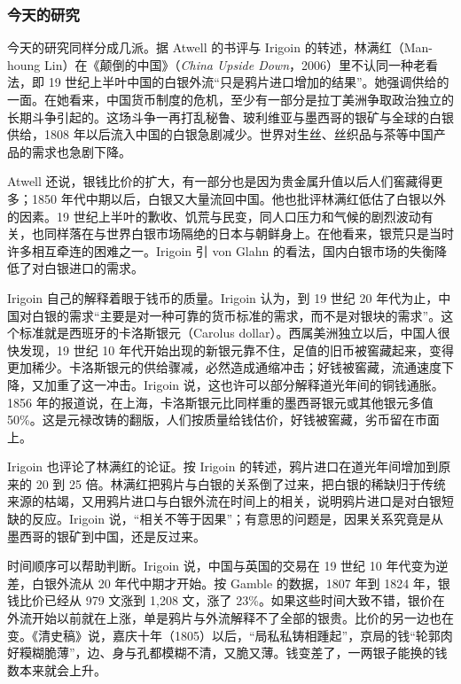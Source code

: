 \subsubsection{今天的研究}
今天的研究同样分成几派。据 Atwell 的书评与 Irigoin 的转述，林满红（Man-houng Lin）在《颠倒的中国》（\emph{China Upside Down}，2006）里不认同一种老看法，即 19 世纪上半叶中国的白银外流“只是鸦片进口增加的结果”\cite{atwell2008}。她强调供给的一面。在她看来，中国货币制度的危机，至少有一部分是拉丁美洲争取政治独立的长期斗争引起的。这场斗争一再打乱秘鲁、玻利维亚与墨西哥的银矿与全球的白银供给，1808 年以后流入中国的白银急剧减少。世界对生丝、丝织品与茶等中国产品的需求也急剧下降\cite{atwell2008,irigoin2013}。

Atwell 还说，银钱比价的扩大，有一部分也是因为贵金属升值以后人们窖藏得更多；1850 年代中期以后，白银又大量流回中国\cite{atwell2008}。他也批评林满红低估了白银以外的因素。19 世纪上半叶的歉收、饥荒与民变，同人口压力和气候的剧烈波动有关，也同样落在与世界白银市场隔绝的日本与朝鲜身上。在他看来，银荒只是当时许多相互牵连的困难之一\cite{atwell2008}。Irigoin 引 von Glahn 的看法，国内白银市场的失衡降低了对白银进口的需求\cite{irigoin2013}。

Irigoin 自己的解释着眼于钱币的质量。Irigoin 认为，到 19 世纪 20 年代为止，中国对白银的需求“主要是对一种可靠的货币标准的需求，而不是对银块的需求”。这个标准就是西班牙的卡洛斯银元（Carolus dollar）\cite{irigoin2013}。西属美洲独立以后，中国人很快发现，19 世纪 10 年代开始出现的新银元靠不住，足值的旧币被窖藏起来，变得更加稀少。卡洛斯银元的供给骤减，必然造成通缩冲击；好钱被窖藏，流通速度下降，又加重了这一冲击。Irigoin 说，这也许可以部分解释道光年间的铜钱通胀\cite{irigoin2013}。1856 年的报道说，在上海，卡洛斯银元比同样重的墨西哥银元或其他银元多值 50\%\cite{irigoin2013}。这是元禄改铸的翻版，人们按质量给钱估价，好钱被窖藏，劣币留在市面上。

Irigoin 也评论了林满红的论证。按 Irigoin 的转述，鸦片进口在道光年间增加到原来的 20 到 25 倍。林满红把鸦片与白银的关系倒了过来，把白银的稀缺归于传统来源的枯竭，又用鸦片进口与白银外流在时间上的相关，说明鸦片进口是对白银短缺的反应。Irigoin 说，“相关不等于因果”；有意思的问题是，因果关系究竟是从墨西哥的银矿到中国，还是反过来\cite{irigoin2013}。

时间顺序可以帮助判断。Irigoin 说，中国与英国的交易在 19 世纪 10 年代变为逆差，白银外流从 20 年代中期才开始\cite{irigoin2013}。按 Gamble 的数据，1807 年到 1824 年，银钱比价已经从 979 文涨到 1,208 文，涨了 23\%\cite{gamble1943}。如果这些时间大致不错，银价在外流开始以前就在上涨，单是鸦片与外流解释不了全部的银贵。比价的另一边也在变。《清史稿》说，嘉庆十年（1805）以后，“局私私铸相踵起”，京局的钱“轮郭肉好糢糊脆薄”，边、身与孔都模糊不清，又脆又薄\cite{qingshigao}。钱变差了，一两银子能换的钱数本来就会上升。

